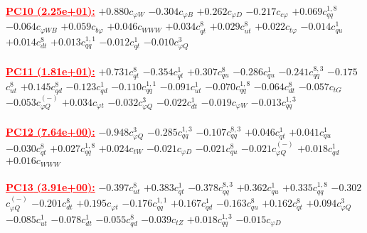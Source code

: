 \documentclass{article}
\begin{document}
\noindent \textcolor{red}{\underline{\bf{PC10} (2.25e+01):}}
{$+0.880$}{\rm $c_{\varphi W}$}
{$-0.304$}{\rm $c_{\varphi B}$}
{$+0.262$}{\rm $c_{\varphi D}$}
{$-0.217$}{\rm $c_{c \varphi}$}
{$+0.069$}{\rm $c_{qq}^{1,8}$}
{$-0.064$}{\rm $c_{\varphi WB}$}
{$+0.059$}{\rm $c_{b \varphi}$}
{$+0.046$}{\rm $c_{WWW}$}
{$+0.034$}{\rm $c_{qt}^{8}$}
{$+0.029$}{\rm $c_{ut}^{8}$}
{$+0.022$}{\rm $c_{t \varphi}$}
{$-0.014$}{\rm $c_{qu}^{1}$}
{$+0.014$}{\rm $c_{dt}^{8}$}
{$+0.013$}{\rm $c_{qq}^{1,1}$}
{$-0.012$}{\rm $c_{qt}^{1}$}
{$-0.010$}{\rm $c_{\varphi Q}^{3}$}
 \nonumber \\ \nonumber \\
\noindent \textcolor{red}{\underline{\bf{PC11} (1.81e+01):}}
{$+0.731$}{\rm $c_{qt}^{8}$}
{$-0.354$}{\rm $c_{qt}^{1}$}
{$+0.307$}{\rm $c_{qu}^{8}$}
{$-0.286$}{\rm $c_{qu}^{1}$}
{$-0.241$}{\rm $c_{qq}^{8,3}$}
{$-0.175$}{\rm $c_{ut}^{8}$}
{$+0.145$}{\rm $c_{qd}^{8}$}
{$-0.123$}{\rm $c_{qd}^{1}$}
{$-0.110$}{\rm $c_{qq}^{1,1}$}
{$-0.091$}{\rm $c_{ut}^{1}$}
{$-0.070$}{\rm $c_{qq}^{1,8}$}
{$-0.064$}{\rm $c_{dt}^{8}$}
{$-0.057$}{\rm $c_{tG}$}
{$-0.053$}{\rm $c_{\varphi Q}^{(-)}$}
{$+0.034$}{\rm $c_{\varphi t}$}
{$-0.032$}{\rm $c_{\varphi Q}^{3}$}
{$-0.022$}{\rm $c_{dt}^{1}$}
{$-0.019$}{\rm $c_{\varphi W}$}
{$-0.013$}{\rm $c_{qq}^{1,3}$}
 \nonumber \\ \nonumber \\
\noindent \textcolor{red}{\underline{\bf{PC12} (7.64e+00):}}
{$-0.948$}{\rm $c_{\varphi Q}^{3}$}
{$-0.285$}{\rm $c_{qq}^{1,3}$}
{$-0.107$}{\rm $c_{qq}^{8,3}$}
{$+0.046$}{\rm $c_{qt}^{1}$}
{$+0.041$}{\rm $c_{qu}^{1}$}
{$-0.030$}{\rm $c_{qt}^{8}$}
{$+0.027$}{\rm $c_{qq}^{1,8}$}
{$+0.024$}{\rm $c_{tW}$}
{$-0.021$}{\rm $c_{\varphi D}$}
{$-0.021$}{\rm $c_{qu}^{8}$}
{$-0.021$}{\rm $c_{\varphi Q}^{(-)}$}
{$+0.018$}{\rm $c_{qd}^{1}$}
{$+0.016$}{\rm $c_{WWW}$}
 \nonumber \\ \nonumber \\
\noindent \textcolor{red}{\underline{\bf{PC13} (3.91e+00):}}
{$-0.397$}{\rm $c_{ut}^{8}$}
{$+0.383$}{\rm $c_{qt}^{1}$}
{$-0.378$}{\rm $c_{qq}^{8,3}$}
{$+0.362$}{\rm $c_{qu}^{1}$}
{$+0.335$}{\rm $c_{qq}^{1,8}$}
{$-0.302$}{\rm $c_{\varphi Q}^{(-)}$}
{$-0.201$}{\rm $c_{dt}^{8}$}
{$+0.195$}{\rm $c_{\varphi t}$}
{$-0.176$}{\rm $c_{qq}^{1,1}$}
{$+0.167$}{\rm $c_{qd}^{1}$}
{$-0.163$}{\rm $c_{qu}^{8}$}
{$+0.162$}{\rm $c_{qt}^{8}$}
{$+0.094$}{\rm $c_{\varphi Q}^{3}$}
{$-0.085$}{\rm $c_{ut}^{1}$}
{$-0.078$}{\rm $c_{dt}^{1}$}
{$-0.055$}{\rm $c_{qd}^{8}$}
{$-0.039$}{\rm $c_{tZ}$}
{$+0.018$}{\rm $c_{qq}^{1,3}$}
{$-0.015$}{\rm $c_{\varphi D}$}
\end{document}
